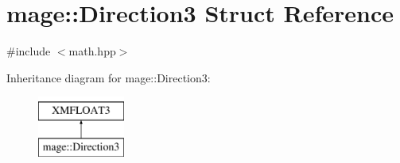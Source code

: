 \hypertarget{structmage_1_1_direction3}{}\section{mage\+:\+:Direction3 Struct Reference}
\label{structmage_1_1_direction3}


{\ttfamily \#include $<$math.\+hpp$>$}

Inheritance diagram for mage\+:\+:Direction3\+:\begin{figure}[H]
\begin{center}
\leavevmode
\includegraphics[height=2.000000cm]{structmage_1_1_direction3}
\end{center}
\end{figure}
